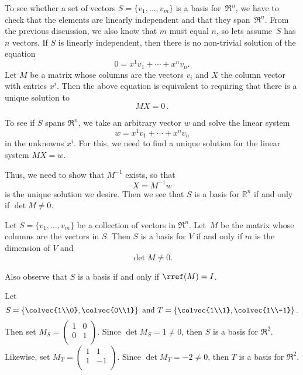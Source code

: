 To see whether a set of vectors $S=\{v_1, \ldots, v_m \}$ is a basis for~$\Re^n$, we have to check that the elements  are linearly independent and that they span~$\Re^n$.  From the previous discussion, we also know that $m$ must equal $n$, so lets assume~$S$ has $n$ vectors.
If $S$ is linearly independent, then there is no non-trivial solution of the equation
\[
0 = x^1v_1+\cdots + x^nv_n.
\]
Let $M$ be a matrix whose columns are the vectors $v_i$ and $X$ the column vector with entries $x^i$.  Then the above equation is equivalent to requiring that there is a unique solution to \[MX=0\, .\]

To see if $S$ spans $\Re^n$, we take an arbitrary vector $w$ and solve the linear system
\[
w=x^1v_1+\cdots + x^nv_n
\]
in the unknowns $x^i$.  For this, we need to find a unique solution for the linear system $MX=w$.  

Thus, we need to show that $M^{-1}$ exists, so that 
\[
X=M^{-1}w
\]
is the unique solution we desire.  Then we see that $S$ is a basis for $\mathbb{R}^n$ if and only if $\det M\neq 0$.




\begin{theorem}
Let $S=\{v_1, \ldots, v_m \}$ be a collection of vectors in $\Re^n$.  Let~$M$ be the matrix whose columns are the vectors in $S$.  Then $S$ is a basis for $V$ if and only if $m$ is the dimension of $V$ and 
\[
\det M \neq 0.
\]
\end{theorem}

\begin{remark}
Also observe that  $S$ is a basis if and only if $\rref(M)=I$.
\end{remark}

\begin{example}
Let 
\[
S=\left\{ \colvec{1\\0}, \colvec{0\\1} \right\} \text{ and }
T=\left\{ \colvec{1\\1}, \colvec{1\\-1} \right\}.
\]
Then set $M_S=\begin{pmatrix}
1 & 0\\
0 & 1\\
\end{pmatrix}$.  Since $\det M_S=1\neq 0$, then $S$ is a basis for $\Re^2$.\\

\noindent
Likewise, set $M_T=\begin{pmatrix}
1 & 1\\
1 & -1\\
\end{pmatrix}$.  Since $\det M_T=-2\neq 0$, then $T$ is a basis for $\Re^2$.
\end{example}


